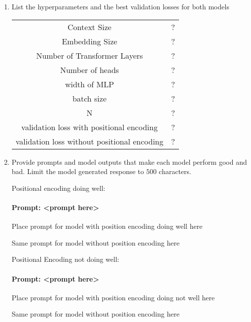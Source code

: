 \documentclass{article}
\begin{document}
\newpage
\begin{enumerate}
\item List the hyperparameters and the best validation losses for both models
\begin{center}
\begin{tabular}{c|c}
    Context Size & ? \\
    Embedding Size & ? \\
    Number of Transformer Layers & ? \\
    Number of heads & ? \\
    width of MLP & ? \\
    batch size & ? \\
    N & ? \\
    validation loss with positional encoding & ? \\
    validation loss without positional encoding & ?
\end{tabular}
\end{center}

\item Provide prompts and model outputs that make each model perform good and bad. Limit the model generated response to $500$ characters.  

Positional encoding doing well:
\paragraph{Prompt: <prompt here>}
\begin{displayquote}
Place prompt for model with position encoding doing well here
\end{displayquote}

\begin{displayquote}
Same prompt for model without position encoding here
\end{displayquote}

Positional Encoding not doing well:
\paragraph{Prompt: <prompt here>}
\begin{displayquote}
Place prompt for model with position encoding doing not well here
\end{displayquote}

\begin{displayquote}
Same prompt for model without position encoding here
\end{displayquote}


\end{enumerate}
\end{document}
